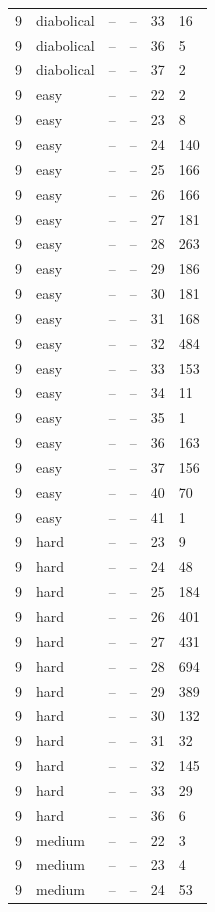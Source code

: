 \begin{tabular}{llllll}
9 & diabolical & -- & -- & 33 & 16 \\
9 & diabolical & -- & -- & 36 & 5 \\
9 & diabolical & -- & -- & 37 & 2 \\
9 & easy & -- & -- & 22 & 2 \\
9 & easy & -- & -- & 23 & 8 \\
9 & easy & -- & -- & 24 & 140 \\
9 & easy & -- & -- & 25 & 166 \\
9 & easy & -- & -- & 26 & 166 \\
9 & easy & -- & -- & 27 & 181 \\
9 & easy & -- & -- & 28 & 263 \\
9 & easy & -- & -- & 29 & 186 \\
9 & easy & -- & -- & 30 & 181 \\
9 & easy & -- & -- & 31 & 168 \\
9 & easy & -- & -- & 32 & 484 \\
9 & easy & -- & -- & 33 & 153 \\
9 & easy & -- & -- & 34 & 11 \\
9 & easy & -- & -- & 35 & 1 \\
9 & easy & -- & -- & 36 & 163 \\
9 & easy & -- & -- & 37 & 156 \\
9 & easy & -- & -- & 40 & 70 \\
9 & easy & -- & -- & 41 & 1 \\
9 & hard & -- & -- & 23 & 9 \\
9 & hard & -- & -- & 24 & 48 \\
9 & hard & -- & -- & 25 & 184 \\
9 & hard & -- & -- & 26 & 401 \\
9 & hard & -- & -- & 27 & 431 \\
9 & hard & -- & -- & 28 & 694 \\
9 & hard & -- & -- & 29 & 389 \\
9 & hard & -- & -- & 30 & 132 \\
9 & hard & -- & -- & 31 & 32 \\
9 & hard & -- & -- & 32 & 145 \\
9 & hard & -- & -- & 33 & 29 \\
9 & hard & -- & -- & 36 & 6 \\
9 & medium & -- & -- & 22 & 3 \\
9 & medium & -- & -- & 23 & 4 \\
9 & medium & -- & -- & 24 & 53 \\

\end{tabular}
